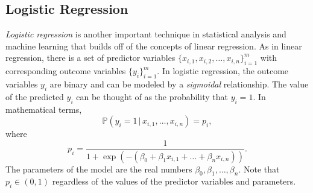 %
%

\subsection*{Logistic Regression} %

\emph{Logistic regression} is another important technique in statistical analysis and machine learning that builds off of the concepts of linear regression.
As in linear regression, there is a set of predictor variables $\{x_{i, 1}, x_{i, 2}, \dots, x_{i, n}\}_{i = 1}^{m}$ with corresponding outcome variables $\{y_i\}_{i = 1}^{m}$.
In logistic regression, the outcome variables $y_i$ are binary and can be modeled by a \emph{sigmoidal} relationship.
The value of the predicted $y_i$ can be thought of as the probability that $y_i = 1$.
In mathematical terms,
\[
\mathbb{P}(y_i = 1 \, | \, x_{i,1}, \dots, x_{i,n}) = p_i,
\]
where
\[
p_i = \frac{1}{1+\exp(-(\beta_0 + \beta_1x_{i,1} + \dots + \beta_nx_{i,n}))}.
\]
The parameters of the model are the real numbers $\beta_0, \beta_1,\dots, \beta_n$.
Note that $p_i \in (0, 1)$ regardless of the values of the predictor variables and parameters.

